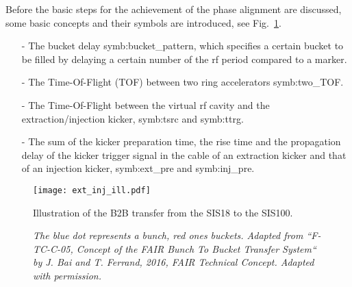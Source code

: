 
Before the basic steps for the achievement of the phase alignment are discussed, some basic concepts and their symbols are introduced, see Fig.~\ref{ext_inj_kicker}.

\begin{itemize}
\item[-] The bucket delay \gls{symb:bucket_pattern}, which specifies a certain bucket to be filled by delaying a certain number of the rf period compared to a marker.
\item[-] The Time-Of-Flight (\gls{TOF}) between two ring accelerators \gls{symb:two_TOF}. 
\item[-] The Time-Of-Flight between the virtual rf cavity and the extraction/injection kicker, \gls{symb:tsrc} and \gls{symb:ttrg}. 
\item[-] The sum of the kicker preparation time, the rise time and the propagation delay of the kicker trigger signal in the cable of an extraction kicker and that of an injection kicker, \gls{symb:ext_pre} and \gls{symb:inj_pre}.
\end{itemize}
\begin{landscape}
\begin{figure}[!htb]
   \centering   
   \texttt{[image: ext\_inj\_ill.pdf]}
   \caption{Illustration of the B2B transfer from the SIS18 to the SIS100.}
	\caption*{\textsl{\small{The blue dot represents a bunch, red ones buckets. Adapted from ``F-TC-C-05, Concept of the FAIR Bunch To Bucket Transfer System`` by J. Bai and T. Ferrand, 2016, FAIR Technical Concept. Adapted with permission.}}}
   \label{ext_inj_kicker}
\end{figure}
\end{landscape}
